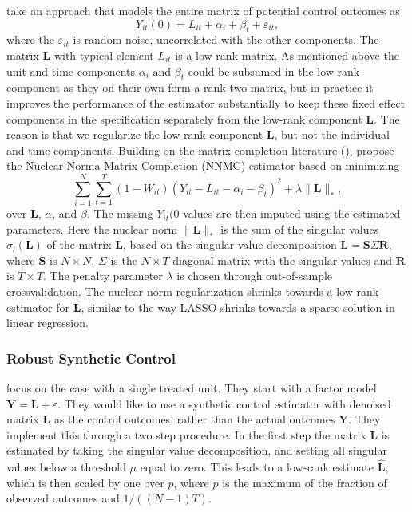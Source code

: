 \documentclass[letterpaper,12pt,leqno]{article}
\begin{document}
\citep*{athey2021matrix} take an approach that models the entire matrix of potential control outcomes as
\[ Y_{it}(0)=L_{it}+\alpha_i+\beta_t+\varepsilon_{it},\]
where the $\varepsilon_{it}$ is random noise, uncorrelated with the other components. The matrix $\mathbf{L}$ with typical element $L_{it}$ is a low-rank matrix. As mentioned above the unit and time components $\alpha_i$ and $\beta_t$ could be subsumed in the low-rank component as they on their own form a rank-two matrix, but in practice it improves the performance of the estimator substantially to keep these fixed effect components in the specification separately from the low-rank component $\mathbf{L}$. The reason is that we regularize the low rank component $\mathbf{L}$, but not the individual and time components.
Building on the matrix completion literature (\citep{candes2009exact, candes2010matrix}), \citep*{athey2021matrix} propose the Nuclear-Norma-Matrix-Completion (NNMC) estimator based on minimizing
\[
\sum_{i=1}^N\sum_{t=1}^T (1-W_{it})
\left(Y_{it}-L_{it}-\alpha_i-\beta_t
\right)^2+\lambda\|\mathbf{L}\|_*,
\]
over $\mathbf{L}$, $\alpha$, and $\beta$. The missing $Y_{it}(0$ values are then imputed using the estimated parameters.
Here the nuclear norm $\|\mathbf{L}\|_*$ is the sum of the singular values $\sigma_l(\mathbf{L})$ of the matrix $\mathbf{L}$, based on the singular value decomposition $\mathbf{L}=\mathbf{S}\Sigma\mathbf{R}$, 
where $\mathbf{S}$ is $N\times N$, $\Sigma$ is the $N\times T$ diagonal matrix with the singular values and 
$\mathbf{R}$ is $T\times T$. The penalty parameter
$\lambda$ is chosen through out-of-sample crossvalidation.  
The nuclear norm regularization shrinks towards a low rank estimator for $\mathbf{L}$, similar to the way LASSO shrinks towards a sparse solution in linear regression.


\subsubsection{Robust Synthetic Control}


\citep*{amjad2018robust}  focus on the case with a single treated unit. 
They start with a factor model $\mathbf{Y}=\mathbf{L}+\varepsilon$. They would like to use a synthetic control estimator with denoised matrix $\mathbf{L}$ as the control outcomes, rather than the actual outcomes $\mathbf{Y}$. They implement this through a two step procedure. In the first step the matrix  $\mathbf{L}$ is estimated by taking the singular value decomposition, and setting all singular values below a threshold $\mu$ equal to zero. This leads to a low-rank estimate $\hat{\mathbf{L}}$, which is then scaled by one over $p$, where $p$ is the maximum of the fraction of observed outcomes and $1/((N-1)T)$. 
\end{document}
